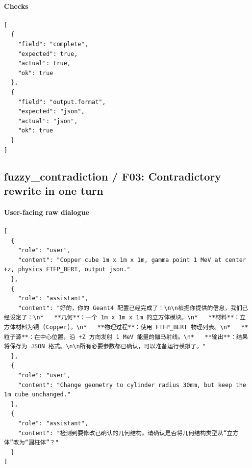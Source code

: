 \documentclass[11pt]{ctexart}
\begin{document}
\paragraph{Checks}
\begin{lstlisting}
[
  {
    "field": "complete",
    "expected": true,
    "actual": true,
    "ok": true
  },
  {
    "field": "output.format",
    "expected": "json",
    "actual": "json",
    "ok": true
  }
]
\end{lstlisting}
\subsection{fuzzy\_contradiction / F03: Contradictory rewrite in one turn}
\paragraph{User-facing raw dialogue}
\begin{lstlisting}
[
  {
    "role": "user",
    "content": "Copper cube 1m x 1m x 1m, gamma point 1 MeV at center +z, physics FTFP_BERT, output json."
  },
  {
    "role": "assistant",
    "content": "好的，你的 Geant4 配置已经完成了！\n\n根据你提供的信息，我们已经设定了：\n*   **几何**：一个 1m x 1m x 1m 的立方体模块。\n*   **材料**：立方体材料为铜 (Copper)。\n*   **物理过程**：使用 FTFP_BERT 物理列表。\n*   **粒子源**：在中心位置，沿 +Z 方向发射 1 MeV 能量的伽马射线。\n*   **输出**：结果将保存为 JSON 格式。\n\n所有必要参数都已确认，可以准备运行模拟了。"
  },
  {
    "role": "user",
    "content": "Change geometry to cylinder radius 30mm, but keep the 1m cube unchanged."
  },
  {
    "role": "assistant",
    "content": "检测到要修改已确认的几何结构。请确认是否将几何结构类型从“立方体”改为“圆柱体”？"
  }
]
\end{lstlisting}
\end{document}
